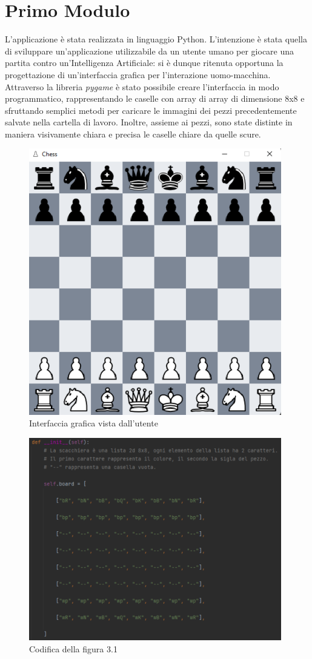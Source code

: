 \section{Primo Modulo}
L'applicazione è stata realizzata in linguaggio Python. L'intenzione è stata quella di sviluppare un'applicazione utilizzabile da un utente umano per giocare una partita contro un'Intelligenza Artificiale: si è dunque ritenuta opportuna la progettazione di un'interfaccia grafica per l'interazione uomo-macchina. Attraverso la libreria \textit{pygame} è stato possibile creare l'interfaccia in modo programmatico, rappresentando le caselle con array di array di dimensione 8x8 e sfruttando semplici metodi per caricare le immagini dei pezzi precedentemente salvate nella cartella di lavoro. Inoltre, assieme ai pezzi, sono state distinte in maniera visivamente chiara e precisa le caselle chiare da quelle scure. 
\begin{figure}[!htb]
    \includegraphics[width=11cm]{frontmatter/figure/scacchiera_gui.pdf}
    \centering
    \caption{Interfaccia grafica vista dall'utente}
    \label{fig:scacchiera_gui}
\end{figure}
\begin{figure}[!htb]
    \includegraphics[width=11cm]{frontmatter/figure/rappresentazione_scacchiera.pdf}
    \centering
    \caption{Codifica della figura 3.1}
    \label{fig:rappresentazione_scacchiera}
\end{figure}
